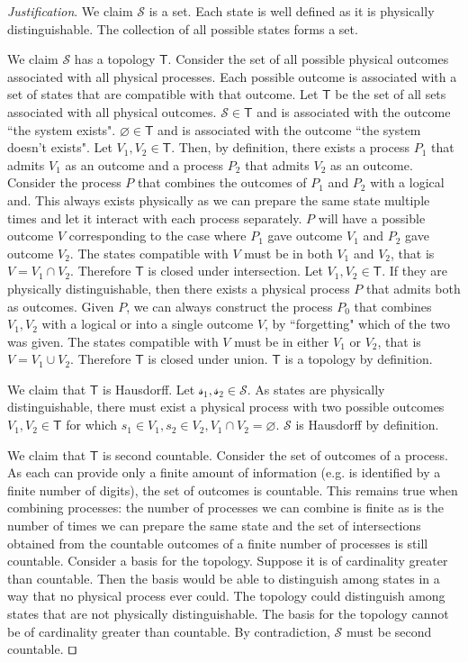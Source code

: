 \documentclass[smallextended]{svjour3}
\numberwithin{equation}{section}
\newenvironment{justification}{\emph{Justification}.}{\hfill\(\qed\)}
\begin{document}
\begin{justification}
We claim $\mathcal{S}$ is a set. Each state is well defined as it is physically distinguishable. The collection of all possible states forms a set.

We claim $\mathcal{S}$ has a topology $\mathsf{T}$. Consider the set of all possible physical outcomes associated with all physical processes. Each possible outcome is associated with a set of states that are compatible with that outcome. Let $\mathsf{T}$ be the set of all sets associated with all physical outcomes. $\mathcal{S} \in \mathsf{T}$ and is associated with the outcome ``the system exists". $\varnothing \in \mathsf{T}$ and is associated with the outcome ``the system doesn't exists". Let $V_1, V_2 \in \mathsf{T}$. Then, by definition, there exists a process $P_1$ that admits $V_1$ as an outcome and a process $P_2$ that admits $V_2$ as an outcome. Consider the process $P$ that combines the outcomes of $P_1$ and $P_2$ with a logical and. This always exists physically as we can prepare the same state multiple times and let it interact with each process separately. $P$ will have a possible outcome $V$ corresponding to the case where $P_1$ gave outcome $V_1$ and $P_2$ gave outcome $V_2$. The states compatible with $V$ must be in both $V_1$ and $V_2$, that is $V = V_1 \cap V_2$. Therefore $\mathsf{T}$ is closed under intersection. Let $V_1, V_2 \in \mathsf{T}$. If they are physically distinguishable, then there exists a physical process $P$ that admits both as outcomes. Given $P$, we can always construct the process $P_0$ that combines $V_1, V_2$ with a logical or into a single outcome $V$, by ``forgetting" which of the two was given. The states compatible with $V$ must be in either $V_1$ or $V_2$, that is $V = V_1 \cup V_2$. Therefore $\mathsf{T}$ is closed under union. $\mathsf{T}$ is a topology by definition.

We claim that $\mathsf{T}$ is Hausdorff. Let $\mathcal{s_1}, \mathcal{s_2} \in \mathcal{S}$. As states are physically distinguishable, there must exist a physical process with two possible outcomes $V_1, V_2 \in \mathsf{T}$ for which $s_1 \in V_1, s_2 \in V_2, V_1 \cap V_2 = \varnothing$. $\mathcal{S}$ is Hausdorff by definition.

We claim that $\mathsf{T}$ is second countable. Consider the set of outcomes of a process. As each can provide only a finite amount of information (e.g. is identified by a finite number of digits), the set of outcomes is countable. This remains true when combining processes: the number of processes we can combine is finite as is the number of times we can prepare the same state and the set of intersections obtained from the countable outcomes of a finite number of processes is still countable. Consider a basis for the topology. Suppose it is of cardinality greater than countable. Then the basis would be able to distinguish among states in a way that no physical process ever could. The topology could distinguish among states that are not physically distinguishable. The basis for the topology cannot be of cardinality greater than countable. By contradiction, $\mathcal{S}$ must be second countable.
\end{justification}
\end{document}
